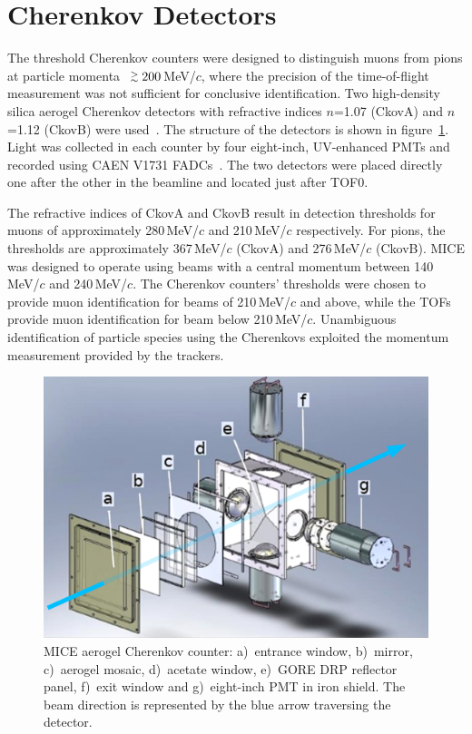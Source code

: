 \graphicspath{{03-Ckov/Figures/}}

\section{Cherenkov Detectors}
\label{Sect:Ckov}

The threshold Cherenkov counters were designed to distinguish
muons from pions at particle 
\linebreak[4] 
momenta~$\gsim 200$\,MeV/$c$, where
the precision of the time-of-flight measurement was not sufficient for
conclusive identification.
Two high-density silica aerogel Cherenkov detectors with refractive
indices $n$=1.07 (CkovA) and $n$=1.12 (CkovB) were used~\cite{Cremaldi:2009zj}.
The structure of the detectors is shown in figure~\ref{fig:ckov1}.
Light was collected in each counter by four eight-inch, UV-enhanced
PMTs and recorded using CAEN V1731 FADCs~\cite{NOTE473}.
The two detectors were placed directly one after the other in the
beamline and located just after TOF0.

The refractive indices of CkovA and CkovB result in detection
thresholds for muons of approximately 280\,MeV/$c$ and 210\,MeV/$c$ respectively.
For pions, the thresholds are approximately 367\,MeV/$c$ (CkovA) and
276\,MeV/$c$ (CkovB).
MICE was designed to operate using beams with a central momentum
between 140\,MeV/$c$ and 240\,MeV/$c$.
The Cherenkov counters' thresholds were chosen to provide muon identification for beams of 210\,MeV/$c$ and above, while the TOFs provide muon identification for beam below 210\,MeV/$c$.
Unambiguous identification of particle species using the Cherenkovs
exploited the momentum measurement provided by the trackers. \\
\begin{figure}[htb]
  \begin{center}
    \includegraphics[width=0.65\columnwidth]{./03-Ckov/Figures/Ckov_fix-with_beam.png}
  \end{center}
  \caption{
    MICE aerogel Cherenkov counter: a)~entrance window,
    b)~mirror, c)~aerogel mosaic, d)~acetate window, e)~GORE DRP reflector
    panel, f)~exit window and g)~eight-inch PMT in iron shield.
    The beam direction is represented by the blue arrow traversing the detector.
  } 
  \label{fig:ckov1}
\end{figure}

